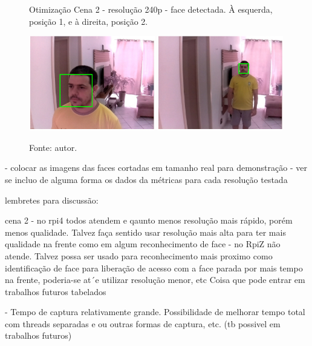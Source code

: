 \begin{figure}[H]
    \centering
    \caption[Otimização Cena 2 - resolução 240p - face detectada. À esquerda posição 1 e à direita, posição 2]{Otimização Cena 2 - resolução 240p - face detectada. À esquerda, posição 1, e à direita, posição 2.}
    \includegraphics[width=0.49\textwidth]{Cap4_Experimentos_Realizados/Figures/cena2_320x240_pos1_face.jpg}
    \includegraphics[width=0.49\textwidth]{Cap4_Experimentos_Realizados/Figures/cena2_320x240_pos2_face.jpg}
    \caption*{Fonte: autor.}
    \label{fig:otimizacaoCena2_240p_faces}
\end{figure}

- colocar as imagens das faces cortadas em tamanho real para demonstração
- ver se incluo de alguma forma os dados da métricas para cada resolução testada



lembretes para discussão:

cena 2
- no rpi4 todos atendem e qaunto menos resolução mais rápido, porém menos qualidade. Talvez faça sentido usar resolução mais alta para ter mais qualidade na frente como em algum reconhecimento de face
- no RpiZ não atende. Talvez possa ser usado para reconhecimento mais proximo como identificação de face para liberação de acesso com a face parada por mais tempo na frente, poderia-se at´e utilizar resolução menor, etc Coisa que pode entrar em trabalhos futuros tabelados

- Tempo de captura relativamente grande. Possibilidade de melhorar tempo total com threads separadas e ou outras formas de captura, etc. (tb possivel em trabalhos futuros)
